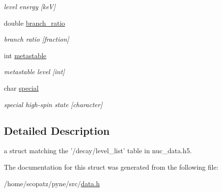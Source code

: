 \begin{DoxyCompactItemize}
\begin{DoxyCompactList}\small\item\em level energy \mbox{[}ke\-V\mbox{]} \end{DoxyCompactList}\item 
\hypertarget{structpyne_1_1level__data_a5ce97c540e0ce558156e5a43510a4633}{double \hyperlink{structpyne_1_1level__data_a5ce97c540e0ce558156e5a43510a4633}{branch\-\_\-ratio}}\label{structpyne_1_1level__data_a5ce97c540e0ce558156e5a43510a4633}

\begin{DoxyCompactList}\small\item\em branch ratio \mbox{[}fraction\mbox{]} \end{DoxyCompactList}\item 
\hypertarget{structpyne_1_1level__data_a7a71068eed39597f007cc6624727e954}{int \hyperlink{structpyne_1_1level__data_a7a71068eed39597f007cc6624727e954}{metastable}}\label{structpyne_1_1level__data_a7a71068eed39597f007cc6624727e954}

\begin{DoxyCompactList}\small\item\em metastable level \mbox{[}int\mbox{]} \end{DoxyCompactList}\item 
\hypertarget{structpyne_1_1level__data_acabc31aa71741dbc2ea5485ca51da0d6}{char \hyperlink{structpyne_1_1level__data_acabc31aa71741dbc2ea5485ca51da0d6}{special}}\label{structpyne_1_1level__data_acabc31aa71741dbc2ea5485ca51da0d6}

\begin{DoxyCompactList}\small\item\em special high-\/spin state \mbox{[}character\mbox{]} \end{DoxyCompactList}\end{DoxyCompactItemize}


\subsection{Detailed Description}
a struct matching the '/decay/level\-\_\-list' table in nuc\-\_\-data.\-h5. 

The documentation for this struct was generated from the following file\-:\begin{DoxyCompactItemize}
\item 
/home/scopatz/pyne/src/\hyperlink{data_8h}{data.\-h}\end{DoxyCompactItemize}
